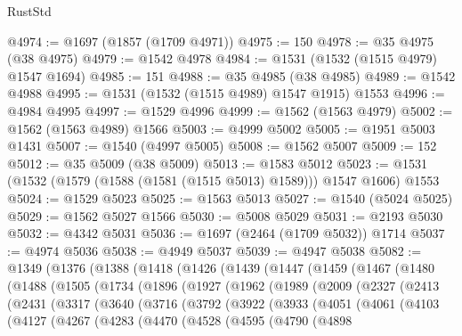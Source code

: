 \begin{lexlean}{RustStd}
\begin{coremodule}
@4974 := @1697 (@1857 (@1709 @4971))
@4975 := 150
@4978 := @35 @4975 (@38 @4975)
@4979 := @1542 @4978
@4984 := @1531 (@1532 (@1515 @4979) @1547 @1694)
@4985 := 151
@4988 := @35 @4985 (@38 @4985)
@4989 := @1542 @4988
@4995 := @1531 (@1532 (@1515 @4989) @1547 @1915) @1553
@4996 := @4984 @4995
@4997 := @1529 @4996
@4999 := @1562 (@1563 @4979)
@5002 := @1562 (@1563 @4989) @1566
@5003 := @4999 @5002
@5005 := @1951 @5003 @1431
@5007 := @1540 (@4997 @5005)
@5008 := @1562 @5007
@5009 := 152
@5012 := @35 @5009 (@38 @5009)
@5013 := @1583 @5012
@5023 := @1531 (@1532 (@1579 (@1588 (@1581 (@1515 @5013) @1589))) @1547 @1606) @1553
@5024 := @1529 @5023
@5025 := @1563 @5013
@5027 := @1540 (@5024 @5025)
@5029 := @1562 @5027 @1566
@5030 := @5008 @5029
@5031 := @2193 @5030
@5032 := @4342 @5031
@5036 := @1697 (@2464 (@1709 @5032)) @1714
@5037 := @4974 @5036
@5038 := @4949 @5037
@5039 := @4947 @5038
@5082 := @1349
    (@1376
      (@1388
        (@1418
          (@1426
            (@1439
              (@1447
                (@1459
                  (@1467
                    (@1480
                      (@1488
                        (@1505
                          (@1734
                            (@1896
                              (@1927
                                (@1962
                                  (@1989
                                    (@2009
                                      (@2327
                                        (@2413
                                          (@2431
                                            (@3317
                                              (@3640
                                                (@3716
                                                  (@3792
                                                    (@3922
                                                      (@3933
                                                        (@4051
                                                          (@4061
                                                            (@4103
                                                              (@4127
                                                                (@4267
                                                                  (@4283
                                                                    (@4470
                                                                      (@4528
                                                                        (@4595
                                                                          (@4790
                                                                            (@4898

\end{coremodule}
\end{lexlean}
